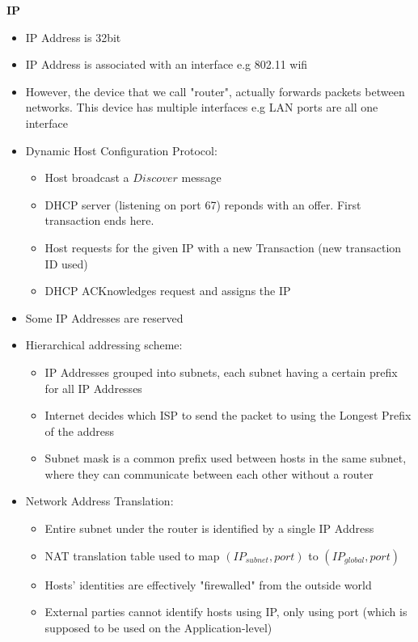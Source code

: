 \documentclass[a4paper]{article} \usepackage[backend=biber, style=numeric, sorting=none]{biblatex}
\begin{document}
\begin{multicols*}{4}
\textbf{IP}
\begin{itemize}[leftmargin=*]
\item IP Address is 32bit
\item IP Address is associated with an interface e.g 802.11 wifi
\item However, the device that we call "router", actually forwards packets between networks. This device has multiple interfaces e.g LAN ports are all one interface
\item Dynamic Host Configuration Protocol:
  \begin{itemize}[leftmargin=*]
  \item Host broadcast a $Discover$ message
  \item DHCP server (listening on port 67) reponds with an offer. First transaction ends here.
  \item Host requests for the given IP with a new Transaction (new transaction ID used)
  \item DHCP ACKnowledges request and assigns the IP
  \end{itemize}
\item Some IP Addresses are reserved
\item Hierarchical addressing scheme:
  \begin{itemize}[leftmargin=*]
  \item IP Addresses grouped into subnets, each subnet having a certain prefix for all IP Addresses
  \item Internet decides which ISP to send the packet to using the Longest Prefix of the address
  \item Subnet mask is a common prefix used between hosts in the same subnet, where they can communicate between each other without a router
  \end{itemize}
\item Network Address Translation:
  \begin{itemize}[leftmargin=*]
  \item Entire subnet under the router is identified by a single IP Address
  \item NAT translation table used to map $(IP_{subnet}, port)$ to $(IP_{global}, port)$
  \item Hosts' identities are effectively "firewalled" from the outside world
  \item External parties cannot identify hosts using IP, only using port (which is supposed to be used on the Application-level)
  \end{itemize}
\end{itemize}



    \end{multicols*}
\end{document}
